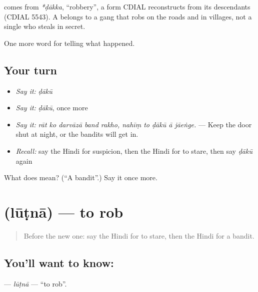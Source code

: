 \begin{cousinweb}
comes from \emph{*ḍākka}, \textquotedblleft{}robbery\textquotedblright{}, a form CDIAL reconstructs from its descendants (CDIAL 5543). A \textbf{} belongs to a gang that robs on the roads and in villages, not a single \textbf{} who steals in secret.
\end{cousinweb}

\begin{grammarlens}[title={What you've built}]
One more word for telling what happened.
\end{grammarlens}

\subsection*{Your turn}
\begin{itemize}
\raggedright
  \item \emph{Say it:} \emph{ḍākū}
  \item \emph{Say it:} \emph{ḍākū}, once more
  \item \emph{Say it:} \emph{rāt ko darvāzā band rakho, nahīṃ to ḍākū ā jāeṅge.} — Keep the door shut at night, or the bandits will get in.
  \item \emph{Recall:} say the Hindi for suspicion, then the Hindi for to stare, then say \emph{ḍākū} again
\end{itemize}

\begin{tcolorbox}[breakable,colback=teal!4,colframe=teal!35!black,title={Before you move on}]
What does  mean? (\textquotedblleft{}A bandit\textquotedblright{}.) Say it once more.
\end{tcolorbox}
\section[\texorpdfstring{\hi{लूटना} (lūṭnā)}{लूटना (lūṭnā)}]{ (lūṭnā) — to rob}

\label{lesson:HI-C292-lutna}



\begin{quote}
Before the new one: say the Hindi for to stare, then the Hindi for a bandit.
\end{quote}

\subsection*{You'll want to know: }
\textbf{} — \emph{lūṭnā} — \textquotedblleft{}to rob\textquotedblright{}.

